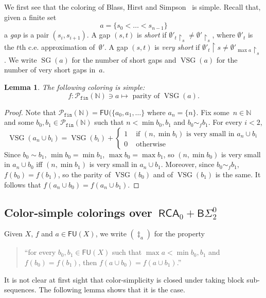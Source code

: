 \documentclass{article}
\newcommand{\uh}{\upharpoonright}
\newcommand{\BSig}{\mathsf{B}\Sigma^0}
\newcommand{\RCA}[0]{\mathsf{RCA}}
\newcommand{\NN}[0]{\mathbb{N}}
\newcommand{\SG}{\operatorname{SG}} %
\newcommand{\VSG}{\operatorname{VSG}} %
\newcommand{\Pfin}{\mathcal{P}_{\mathtt{fin}}}
\newcommand{\FU}[0]{\mathsf{FU}} %
\def\qt#1{``#1''}%
\numberwithin{theorem}{section}
\newtheorem{lemma}[theorem]{Lemma}
\begin{document}
We first see that the coloring of Blass, Hirst and Simpson~\cite{blassLogicalAnalysisTheorems1987} is simple.
Recall that, given a finite set 
$$a  = \{ s_0 < \dots < s_{n-1} \}$$
a \emph{gap} is a pair $(s_i, s_{i+1})$.
A gap $(s, t)$ is \emph{short} if $\emptyset'_t \uh_s \neq \emptyset' \uh_s$, where $\emptyset'_t$ is the $t$th c.e. approximation of~$\emptyset'$. A gap $(s, t)$ is \emph{very short} if $\emptyset'_t \uh s \neq \emptyset'_{\max a} \uh_s$. We write $\SG(a)$ for the number of short gaps and $\VSG(a)$ for the number of very short gaps in~$a$.

\begin{lemma}
The following coloring is simple:
$$f : \Pfin(\NN) \ni a \mapsto \text{ parity of } \VSG(a).$$
\end{lemma}
\begin{proof}
Note that $\Pfin(\NN) = \FU(\{ a_0, a_1, \dots \}$ where $a_n = \{n\}$.
Fix some~$n \in \NN$ and some $b_0, b_1 \in \Pfin(\NN)$ such that $n < \min b_0, b_1$ and $b_0 \sim_f b_1$.
For every $i < 2$,
$$
\VSG(a_n \cup b_i) = \VSG(b_i) + \begin{cases}
    1 & \text{ if } (n, \min b_i) \mbox{ is very small in } a_n \cup b_i\\
    0 & \text{ otherwise}
\end{cases}
$$
Since $b_0 \sim b_1$, $\min b_0 = \min b_1$, $\max b_0 = \max b_1$, so $(n, \min b_0)$ is very small in $a_n \cup b_0$ iff $(n, \min b_1)$ is very small in $a_n \cup b_1$. Moreover, since $b_0 \sim_f b_1$, $f(b_0) = f(b_1)$, so the parity of $\VSG(b_0)$ and of $\VSG(b_1)$ is the same. It follows that $f(a_n \cup b_0) = f(a_n \cup b_1)$.
\end{proof}


\subsection{Color-simple colorings over~$\RCA_0 + \BSig_2$}

Given $X$, $f$ and $a \in \FU(X)$, we write $(\ddagger_a)$ for the property 
\begin{quote}
\qt{for every $b_0, b_1 \in \FU(X)$ such that $\max a < \min b_0, b_1$ and $f(b_0) = f(b_1)$, then $f(a \cup b_0) = f(a \cup b_1)$.}
\end{quote}

It is not clear at first sight that color-simplicity is closed under taking block sub-sequences.
The following lemma shows that it is the case.
\end{document}
